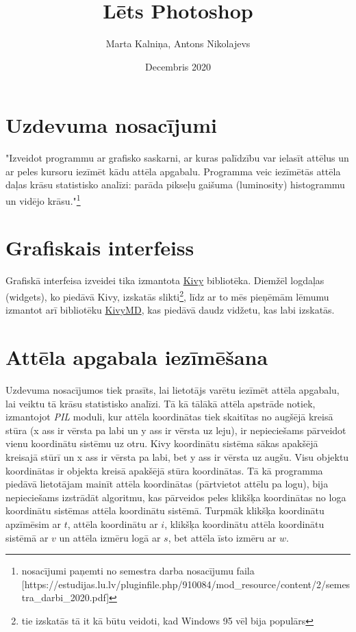 \documentclass{article}
\title{Lēts Photoshop}
\author{Marta Kalniņa, Antons Nikolajevs }
\date{Decembris 2020}
\begin{document}
\maketitle

\section{Uzdevuma nosacījumi}
"Izveidot programmu ar grafisko saskarni, ar kuras palīdzību var ielasīt attēlus un ar peles kursoru iezīmēt kādu attēla apgabalu. Programma veic iezīmētās attēla daļas krāsu statistisko analīzi: parāda pikseļu gaišuma (luminosity) histogrammu un vidējo krāsu."\footnote{nosacījumi paņemti no 
semestra darba nosacījumu faila [https://estudijas.lu.lv/pluginfile.php/910084/mod_resource/content/2/semestra_darbi_2020.pdf]}
\section{Grafiskais interfeiss}
Grafiskā interfeisa izveidei tika izmantota \href{https://kivy.org/#home}{Kivy} bibliotēka. Diemžēl logdaļas (widgets), ko piedāvā Kivy, izskatās slikti\footnote{tie izskatās tā it kā būtu veidoti, kad Windows 95 vēl bija populārs}, līdz ar to mēs pieņēmām lēmumu izmantot arī bibliotēku \href{https://github.com/kivymd/KivyMD}{KivyMD}, kas piedāvā daudz vidžetu, kas labi izskatās.

\section{Attēla apgabala iezīmēšana}
Uzdevuma nosacījumos tiek prasīts, lai lietotājs varētu iezīmēt attēla apgabalu, lai veiktu tā krāsu statistisko analīzi.
Tā kā tālākā attēla apstrāde notiek, izmantojot \textit{PIL} moduli, kur attēla koordinātas tiek skaitītas no augšējā kreisā stūra (x ass ir vērsta pa labi un y ass ir vērsta uz leju), ir nepieciešams pārveidot vienu koordinātu sistēmu uz otru. Kivy koordinātu sistēma sākas apakšējā kreisajā stūrī un x ass ir vērsta pa labi, bet y ass ir vērsta uz augšu. Visu objektu koordinātas ir objekta kreisā apakšējā stūra koordinātas. Tā kā programma piedāvā lietotājam mainīt attēla koordinātas (pārtvietot attēlu pa logu), bija nepieciešams izstrādāt algoritmu, kas pārveidos peles klikšķa koordinātas no loga koordinātu sistēmas attēla koordinātu sistēmā. Turpmāk klikšķa koordinātu apzīmēsim ar $t$, attēla koordinātu ar $i$, klikšķa koordinātu attēla koordinātu sistēmā ar $v$ un attēla izmēru logā ar $s$, bet attēla īsto izmēru ar $w$.
\end{document}
